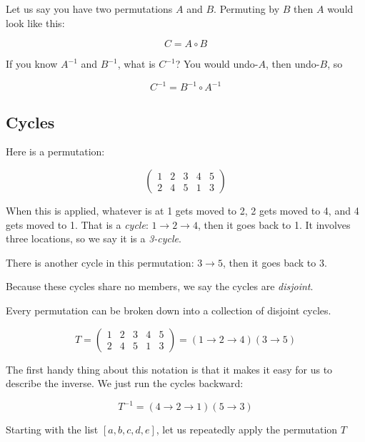 Let us say you have two permutations $A$ and $B$. Permuting by $B$ then $A$ would look like this:

$$C = A \circ B$$

If you know $A^{-1}$ and $B^{-1}$, what is $C^{-1}$?  You would undo-$A$, then undo-$B$, so

$$C^{-1} = B^{-1} \circ A^{-1}$$

\subsection{Cycles}

Here is a permutation:

$$\begin{pmatrix}
  1 & 2 & 3 & 4 & 5 \\
  2 & 4 & 5 & 1 & 3
\end{pmatrix}$$

When this is applied, whatever is at 1 gets moved to 2, 2 gets moved
to 4, and 4 gets moved to 1.  That is a \textit{cycle}: $1 \rightarrow
2 \rightarrow 4$, then it goes back to 1. It involves three locations, so we say
it is a \textit{3-cycle}.

There is another cycle in this permutation: $3 \rightarrow 5$, then it goes back to 3.

Because these cycles share no members, we say the cycles are \textit{disjoint}.

Every permutation can be broken down into a collection of disjoint cycles.

$$T = \begin{pmatrix}
  1 & 2 & 3 & 4 & 5 \\
  2 & 4 & 5 & 1 & 3
\end{pmatrix} = (1 \rightarrow 2 \rightarrow 4)(3 \rightarrow 5)$$

The first handy thing about this notation is that it makes it easy for
us to describe the inverse. We just run the cycles backward:

$$T^{-1} = (4 \rightarrow 2 \rightarrow 1)(5 \rightarrow 3)$$

Starting with the list $[a, b, c, d, e]$, let us repeatedly apply the permutation $T$

